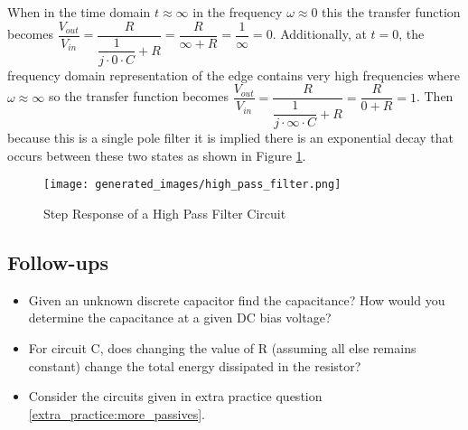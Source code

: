 \documentclass[main.tex]{subfiles}
\begin{document}
\newnoindentpara When in the time domain $t \approx \infty$ in the frequency $\omega \approx 0$ this the transfer function becomes $\dfrac{V_{out}}{V_{in}} = \dfrac{R}{\dfrac{1}{j \cdot 0 \cdot C} + R} = \dfrac{R}{\infty + R} = \dfrac{1}{\infty} = 0$. Additionally, at $t = 0$, the frequency domain representation of the edge contains very high frequencies where $\omega \approx \infty$ so the transfer function becomes $\dfrac{V_{out}}{V_{in}} = \dfrac{R}{\dfrac{1}{j \cdot \infty \cdot C} + R} = \dfrac{R}{0 + R} = 1$. Then because this is a single pole filter it is implied there is an exponential decay that occurs between these two states as shown in Figure \ref{fig:step-response-high-pass-filter}.

\begin{figure}[H]
    \centering
    \texttt{[image: generated\_images/high\_pass\_filter.png]}
    \caption{Step Response of a High Pass Filter Circuit}
    \label{fig:step-response-high-pass-filter}
\end{figure}


\subsection{Follow-ups}
\begin{itemize}
    \item Given an unknown discrete capacitor find the capacitance? How would you determine the capacitance at a given DC bias voltage? %
    \item For circuit C, does changing the value of R (assuming all else remains constant) change the total energy dissipated in the resistor? %
    \item Consider the circuits given in extra practice question \ref{extra_practice:more_passives}. %
\end{itemize}
\end{document}
